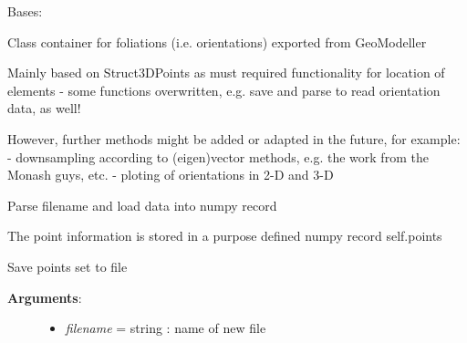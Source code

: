 \documentclass[letterpaper,10pt,english]{sphinxmanual}
\begin{document}
\begin{fulllineitems}
\label{pygeomod:pygeomod.struct_data.Struct3DFoliations}
Bases: {\hyperref[pygeomod:pygeomod.struct_data.Struct3DPoints]{}}

Class container for foliations (i.e. orientations) exported from GeoModeller

Mainly based on Struct3DPoints as must required functionality 
for location of elements - some functions overwritten, e.g. save and parse to read orientation data,
as well!

However, further methods might be added or adapted in the future, for example:
- downsampling according to (eigen)vector methods, e.g. the work from the Monash guys, etc.
- ploting of orientations in 2-D and 3-D

\begin{fulllineitems}
\label{pygeomod:pygeomod.struct_data.Struct3DFoliations.parse}
Parse filename and load data into numpy record

The point information is stored in a purpose defined numpy record
self.points

\end{fulllineitems}


\begin{fulllineitems}
\label{pygeomod:pygeomod.struct_data.Struct3DFoliations.save}
Save points set to file
\begin{description}
\item[{\textbf{Arguments}:}] \leavevmode\begin{itemize}
\item {} 
\emph{filename} = string : name of new file

\end{itemize}

\end{description}

\end{fulllineitems}


\end{fulllineitems}

\end{document}
